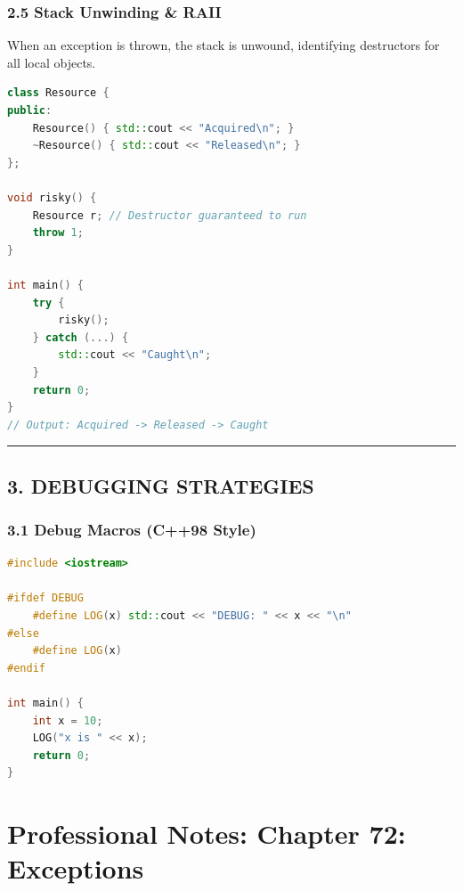 \hypertarget{stack-unwinding-raii}{%
\subsection{2.5 Stack Unwinding \& RAII}\label{stack-unwinding-raii}}

When an exception is thrown, the stack is unwound, identifying
destructors for all local objects.

\begin{lstlisting}[language={C++}]
class Resource {
public:
    Resource() { std::cout << "Acquired\n"; }
    ~Resource() { std::cout << "Released\n"; }
};

void risky() {
    Resource r; // Destructor guaranteed to run
    throw 1;
}

int main() {
    try {
        risky();
    } catch (...) {
        std::cout << "Caught\n";
    }
    return 0;
}
// Output: Acquired -> Released -> Caught
\end{lstlisting}

\begin{center}\rule{0.5\linewidth}{0.5pt}\end{center}

\hypertarget{debugging-strategies}{%
\section{3. DEBUGGING STRATEGIES}\label{debugging-strategies}}

\hypertarget{debug-macros-c98-style}{%
\subsection{3.1 Debug Macros (C++98
Style)}\label{debug-macros-c98-style}}

\begin{lstlisting}[language={C++}]
#include <iostream>

#ifdef DEBUG
    #define LOG(x) std::cout << "DEBUG: " << x << "\n"
#else
    #define LOG(x) 
#endif

int main() {
    int x = 10;
    LOG("x is " << x);
    return 0;
}
\end{lstlisting}

\hypertarget{professional-notes-chapter-72-exceptions}{%
\chapter{Professional Notes: Chapter 72:
Exceptions}\label{professional-notes-chapter-72-exceptions}}

